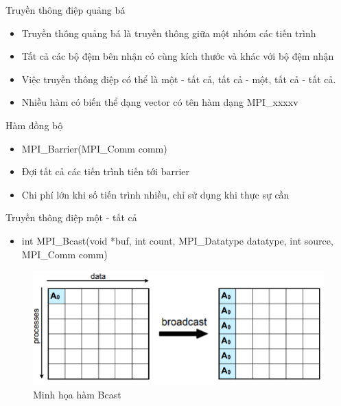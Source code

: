 \documentclass[10pt]{beamer}
\theoremstyle{remark}
\numberwithin{algocf}{section}
\numberwithin{equation}{section}
\numberwithin{dl}{section}
\numberwithin{figure}{section}
\begin{document}
\begin{frame}{Truyền thông điệp quảng bá}
    \begin{itemize}
        \item Truyền thông quảng bá là truyền thông giữa một nhóm các tiến trình
        \item Tất cả các bộ đệm bên nhận có cùng kích thước và khác với bộ đệm nhận 
        \item Việc truyền thông điệp có thể là một - tất cả, tất cả - một, tất cả - tất cả.
        \item Nhiều hàm có biến thể dạng vector có tên hàm dạng MPI\_xxxxv
    \end{itemize}
\end{frame}

\begin{frame}{Hàm đồng bộ}
    \begin{itemize}
        \item MPI\_Barrier(MPI\_Comm comm)
        \item Đợi tất cả các tiến trình tiến tới barrier
        \item Chi phí lớn khi số tiến trình nhiều, chỉ sử dụng khi thực sự cần
    \end{itemize}
\end{frame}

\begin{frame}{Truyền thông điệp một - tất cả}
    \begin{itemize}
        \item int MPI\_Bcast(void *buf, int count,
                             MPI\_Datatype datatype, int source,
                             MPI\_Comm comm)
    \end{itemize}

    \begin{figure}[H]
        \centering
        \includegraphics[height=0.5\textheight]{figures/MPI/Bcast.png}
        \caption{Minh họa hàm Bcast}
    \end{figure}
\end{frame}
\end{document}
